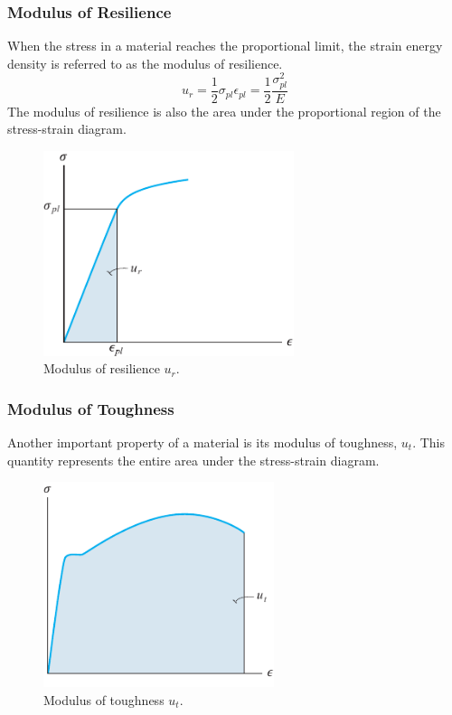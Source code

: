 \documentclass{article}
\begin{document}
\subsubsection{Modulus of Resilience}
When the stress in a material reaches the
proportional limit, the strain energy density
is referred to as the modulus of resilience.
\begin{equation*}
    u_r = \frac{1}{2} \sigma_{pl} \epsilon_{pl} = \frac{1}{2} \frac{\sigma_{pl}^2}{E}
\end{equation*}
The modulus of resilience is also the area under the proportional region of the stress-strain
diagram.
\begin{figure}[H]
    \centering
    \includegraphics[height = 6cm, keepaspectratio = true]{figures/modulus_of_resilience.pdf}
    \caption{Modulus of resilience \(u_r\).}
\end{figure}
\subsubsection{Modulus of Toughness}
Another important property of a material is its modulus of toughness, \(u_t\). This
quantity represents the entire area under the stress-strain diagram.
\begin{figure}[H]
    \centering
    \includegraphics[height = 6cm, keepaspectratio = true]{figures/modulus_of_toughness.pdf}
    \caption{Modulus of toughness \(u_t\).}
\end{figure}
\end{document}
